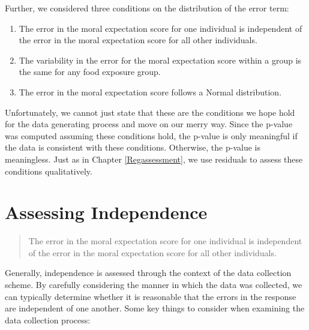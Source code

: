 \documentclass[]{book}
\providecommand{\tightlist}{%
  \setlength{\itemsep}{0pt}\setlength{\parskip}{0pt}}
\theoremstyle{plain}
\theoremstyle{mydefn}
\theoremstyle{myexmpl}
\theoremstyle{remark}
\begin{document}
Further, we considered three conditions on the distribution of the error
term:

\begin{enumerate}
\def\labelenumi{\arabic{enumi}.}
\tightlist
\item
  The error in the moral expectation score for one individual is
  independent of the error in the moral expectation score for all other
  individuals.\\
\item
  The variability in the error for the moral expectation score within a
  group is the same for any food exposure group.
\item
  The error in the moral expectation score follows a Normal
  distribution.
\end{enumerate}

Unfortunately, we cannot just state that these are the conditions we
hope hold for the data generating process and move on our merry way.
Since the p-value was computed assuming these conditions hold, the
p-value is only meaningful if the data is consistent with these
conditions. Otherwise, the p-value is meaningless. Just as in Chapter
\ref{Regassessment}, we use residuals to assess these conditions
qualitatively.

\section{Assessing Independence}\label{assessing-independence-1}

\begin{quote}
The error in the moral expectation score for one individual is
independent of the error in the moral expectation score for all other
individuals.
\end{quote}

Generally, independence is assessed through the context of the data
collection scheme. By carefully considering the manner in which the data
was collected, we can typically determine whether it is reasonable that
the errors in the response are independent of one another. Some key
things to consider when examining the data collection process:
\end{document}
